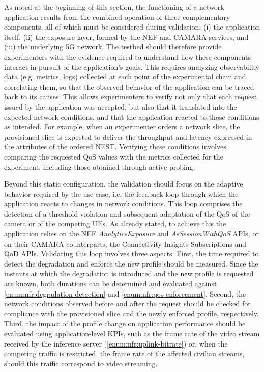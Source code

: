 As noted at the beginning of this section, the functioning of a network application results from the combined operation of three complementary components, all of which must be considered during validation: (i) the application itself, (ii) the exposure layer, formed by the \acs{NEF} and CAMARA services, and (iii) the underlying \acs{5G} network. The testbed should therefore provide experimenters with the evidence required to understand how these components interact in pursuit of the application's goals. This requires analyzing observability data (e.g. metrics, logs) collected at each point of the experimental chain and correlating them, so that the observed behavior of the application can be traced back to its causes. This allows experimenters to verify not only that each request issued by the application was accepted, but also that it translated into the expected network conditions, and that the application reacted to those conditions as intended. For example, when an experimenter orders a network slice, the provisioned slice is expected to deliver the throughput and latency expressed in the attributes of the ordered \acs{NEST}. Verifying these conditions involves comparing the requested \acs{QoS} values with the metrics collected for the experiment, including those obtained through active probing.

Beyond this static configuration, the validation should focus on the adaptive behavior required by the use case, i.e. the feedback loop through which the application reacts to changes in network conditions. This loop comprises the detection of a threshold violation and subsequent adaptation of the \acs{QoS} of the camera or of the competing \acsp{UE}. As already stated, to achieve this the application relies on the \acs{NEF} \textit{AnalyticsExposure} and \textit{AsSessionWithQoS} \acsp{API}, or on their CAMARA counterparts, the Connectivity Insights Subscriptions and \acs{QoD} \acsp{API}. Validating this loop involves three aspects. First, the time required to detect the degradation and enforce the new profile should be measured. Since the instants at which the degradation is introduced and the new profile is requested are known, both durations can be determined and evaluated against \ref{enum:nfr:degradation-detection} and \ref{enum:nfr:qos-enforcement}. Second, the network conditions observed before and after the request should be checked for compliance with the provisioned slice and the newly enforced profile, respectively. Third, the impact of the profile change on application performance should be evaluated using application-level \acsp{KPI}, such as the frame rate of the video stream received by the inference server (\ref{enum:nfr:uplink-bitrate}) or, when the competing traffic is restricted, the frame rate of the affected civilian streams, should this traffic correspond to video streaming.

